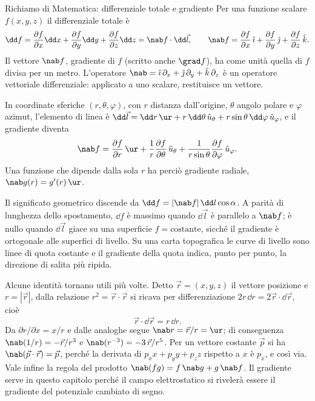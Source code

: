 \documentclass[main.tex]{subfiles}
\begin{document}
	\begin{riquadro}{Richiamo di Matematica: differenziale totale e gradiente}
		Per una funzione scalare $f(x,y,z)$ il differenziale totale è
		\[
		\dd f=\frac{\partial f}{\partial x}\dd x+\frac{\partial f}{\partial y}\dd y+\frac{\partial f}{\partial z}\dd z=\nab f\cdot\dd\vec l ,
		\qquad
		\nab f=\frac{\partial f}{\partial x}\,\hat\imath+\frac{\partial f}{\partial y}\,\hat\jmath+\frac{\partial f}{\partial z}\,\hat k .
		\]
		Il vettore $\nab f$, gradiente di $f$ (scritto anche $\grad f$), ha come unità quella di $f$ divisa per un metro. L'operatore $\nab=\hat\imath\,\partial_x+\hat\jmath\,\partial_y+\hat k\,\partial_z$ è un operatore vettoriale differenziale: applicato a uno scalare, restituisce un vettore.
		
		In coordinate sferiche $(r,\theta,\varphi)$, con $r$ distanza dall'origine, $\theta$ angolo polare e $\varphi$ azimut, l'elemento di linea è $\dd\vec l=\dd r\,\ur+r\,\dd\theta\,\hat u_\theta+r\sin\theta\,\dd\varphi\,\hat u_\varphi$, e il gradiente diventa
		\[
		\nab f=\frac{\partial f}{\partial r}\,\ur+\frac1r\frac{\partial f}{\partial\theta}\,\hat u_\theta+\frac{1}{r\sin\theta}\frac{\partial f}{\partial\varphi}\,\hat u_\varphi .
		\]
		Una funzione che dipende dalla sola $r$ ha perciò gradiente radiale, $\nab g(r)=g'(r)\,\ur$.
		
		Il significato geometrico discende da $\dd f=|\nab f|\,\dd l\cos\alpha$. A parità di lunghezza dello spostamento, $\dd f$ è massimo quando $\dd\vec l$ è parallelo a $\nab f$; è nullo quando $\dd\vec l$ giace su una superficie $f=\text{costante}$, sicché il gradiente è ortogonale alle superfici di livello. Su una carta topografica le curve di livello sono linee di quota costante e il gradiente della quota indica, punto per punto, la direzione di salita più ripida.
		
		Alcune identità tornano utili più volte. Detto $\vec r=(x,y,z)$ il vettore posizione e $r=|\vec r|$, dalla relazione $r^2=\vec r\cdot\vec r$ si ricava per differenziazione $2r\,\dd r=2\vec r\cdot\dd\vec r$, cioè
		\[
		\vec r\cdot\dd\vec r=r\,\dd r .
		\]
		Da $\partial r/\partial x=x/r$ e dalle analoghe segue $\nab r=\vec r/r=\ur$; di conseguenza $\nab(1/r)=-\vec r/r^3$ e $\nab(r^{-3})=-3\,\vec r/r^5$. Per un vettore costante $\vec p$ si ha $\nab(\vec p\cdot\vec r)=\vec p$, perché la derivata di $p_xx+p_yy+p_zz$ rispetto a $x$ è $p_x$, e così via. Vale infine la regola del prodotto $\nab(fg)=f\,\nab g+g\,\nab f$. Il gradiente serve in questo capitolo perché il campo elettrostatico si rivelerà essere il gradiente del potenziale cambiato di segno.
	\end{riquadro}
	
\end{document}

